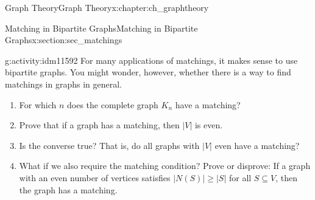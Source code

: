 \documentclass[oneside,10pt,]{book}
\numberwithin{equation}{chapter}
\newcommand{\card}[1]{\left| #1 \right|}
\begin{document}
\begin{chapterptx}{Graph Theory}{}{Graph Theory}{}{}{x:chapter:ch_graphtheory}
\begin{sectionptx}{Matching in Bipartite Graphs}{}{Matching in Bipartite Graphs}{}{}{x:section:sec_matchings}
\begin{activity}{}{g:activity:idm11592}%
For many applications of matchings, it makes sense to use bipartite graphs. You might wonder, however, whether there is a way to find matchings in graphs in general.%
\begin{enumerate}[font=\bfseries,label=(\alph*),ref=\alph*]
\item{}For which \(n\) does the complete graph \(K_n\) have a matching?%
\item{}Prove that if a graph has a matching, then \(\card{V}\) is even.%
\item{}Is the converse true?  That is, do all graphs with \(\card{V}\) even have a matching?%
\item{}What if we also require the matching condition?  Prove or disprove: If a graph with an even number of vertices satisfies \(\card{N(S)} \ge \card{S}\) for all \(S \subseteq V\), then the graph has a matching.%
\end{enumerate}
\end{activity}
\end{sectionptx}
\end{chapterptx}
%
%
%
%
\typeout{************************************************}
\typeout{************************************************}
%
%
\appendix
%
\end{document}
